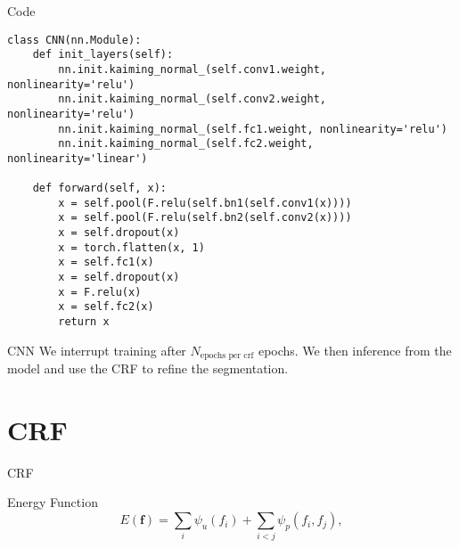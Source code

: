 \begin{frame}[fragile]{Code}
    \footnotesize
    \begin{verbatim}
class CNN(nn.Module):
    def init_layers(self):
        nn.init.kaiming_normal_(self.conv1.weight, nonlinearity='relu')
        nn.init.kaiming_normal_(self.conv2.weight, nonlinearity='relu')
        nn.init.kaiming_normal_(self.fc1.weight, nonlinearity='relu')
        nn.init.kaiming_normal_(self.fc2.weight, nonlinearity='linear')

    def forward(self, x):
        x = self.pool(F.relu(self.bn1(self.conv1(x))))
        x = self.pool(F.relu(self.bn2(self.conv2(x))))
        x = self.dropout(x)
        x = torch.flatten(x, 1)
        x = self.fc1(x)
        x = self.dropout(x)
        x = F.relu(x)
        x = self.fc2(x)
        return x
    \end{verbatim}
\end{frame}

\begin{frame}{CNN}
    We interrupt training after $N_{\text{epochs per crf}}$ epochs. We then inference
    from the model and use the CRF to refine the segmentation.
\end{frame}

\section{CRF}
\begin{frame}{CRF}
    \begin{block}{Energy Function}
        \begin{equation*}
            E(\mathbf{f}) = \sum_{i} \psi_u(f_{i})
                            + \sum_{i < j} \psi_p(f_{i}, f_{j}),
        \end{equation*}
    \end{block}
\end{frame}

